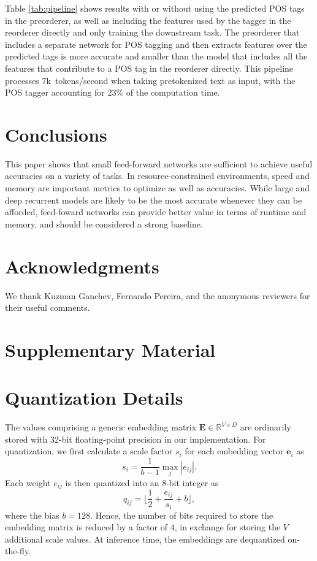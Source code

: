 \documentclass[11pt,letterpaper]{article}
\begin{document}
Table \ref{tab:pipeline} shows results with or without using the predicted POS tags in the preorderer,
as well as including the features used by the  tagger in the reorderer directly and only training the downstream task.  
 The preorderer that includes a separate network for POS tagging and then extracts features over the predicted tags is 
 more accurate and smaller than the model that includes all the features that contribute to a POS tag in the reorderer directly.
This pipeline processes 7k~tokens/second when taking pretokenized text as input, with the POS tagger accounting for 23\% of the computation time.

\section{Conclusions}
This paper shows that small feed-forward networks are sufficient to achieve
useful accuracies on a variety of tasks.
In resource-constrained environments, speed and memory are important 
metrics to optimize as well as accuracies.
While large and deep recurrent models are likely to be the most accurate whenever
they can be afforded,
feed-foward networks can provide better value in terms of runtime and memory,
and should be considered a strong baseline.

\section*{Acknowledgments}
We thank Kuzman Ganchev, Fernando Pereira, and the anonymous reviewers for their useful comments.

\balance




\clearpage
\newpage
\appendix
\renewcommand{\thefigure}{\roman{figure}}
\renewcommand{\thetable}{\roman{table}}

\section*{\Large Supplementary Material}
\vspace{1ex}

\section{Quantization Details}
The values comprising a generic embedding matrix \mbox{$\mathbf{E} \in \mathbb{R}^{V \times D}$} are ordinarily stored with \mbox{32-bit} floating-point precision in our implementation.
For quantization, we first calculate a scale factor $s_i$ for each embedding vector $\mathbf{e}_i$ as \[s_i=\frac{1}{b-1}\max_j \left|e_{ij}\right|.\]
Each weight $e_{ij}$ is then quantized into an 8-bit integer as \[q_{ij}=\lfloor\frac{1}{2} + \frac{e_{ij}}{s_i} + b\rfloor,\] where the bias $b=128$.
Hence, the number of bits required to store the embedding matrix is reduced by a factor of 4, in exchange for storing the $V$ additional scale values. 
At inference time, the embeddings are dequantized on-the-fly. 
\end{document}
